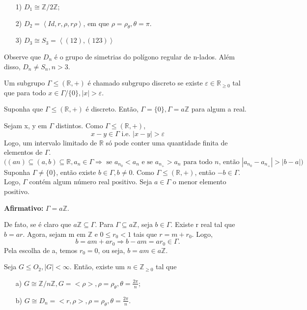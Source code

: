 \documentclass[Algebra/algebra_notes.tex]{subfiles}
\begin{document}
\begin{example*}
	\begin{itemize}
		\item[1)] \(D_{1}\cong{\mathbb{Z}/2 \mathbb{Z}}\);
		\item[2)] \(D_{2} = \left< Id, r, \rho , r\rho  \right>\), em que \(\rho = \rho _{\theta }, \theta =\pi \).
		\item[3)] \(D_{3}\cong{S_{3}} = \left< (12), (123) \right>\)
	\end{itemize}
\end{example*}
Observe que \(D_{n}\) é o grupo de simetrias do polígono regular de n-lados.
Além disso, \(D_{n}\neq S_{n}, n >3\).
\begin{def*}
	Um subgrupo \(\Gamma\leq (\mathbb{R}, +)\) é chamado subgrupo discreto se existe
	\(\varepsilon  \in \mathbb{R}_{\geq 0}\) tal que para todo \(x\in\Gamma/\{0\}, |x| > \varepsilon .\)
\end{def*}
\begin{lemma*}
	Suponha que \(\Gamma\leq (\mathbb{R}, +)\) é discreto. Então, \(\Gamma =\{0\}, \Gamma =a \mathbb{Z}\)
	para algum a real.
\end{lemma*}
\begin{proof*}
	Sejam x, y em \(\Gamma \) distintos. Como \(\Gamma\leq (\mathbb{R}, +)\),
	\[
		x - y\in \Gamma  \text{ i.e. }  |x-y| > \varepsilon
	\]
	Logo, um intervalo limitado de \(\mathbb{R}\) só pode conter uma quantidade finita
	de elementos de \(\Gamma \).
	\[
		\biggl((an)\subseteq{(a,b)\subseteq{\mathbb{R}}}, a_{n}\in \Gamma \Rightarrow \text{ se } a_{n_{0}} < a_{n}\text{ e se } a_{n_{+}} > a_{n}\text{ para todo } n \text{, então } |a_{n_{0}}-a_{n_{+}}| > |b-a| \biggr)
	\]
	Suponha \(\Gamma \neq\{0\}\), então existe \(b\in \Gamma , b\neq0\). Como
	\(\Gamma\leq (\mathbb{R}, +)\), então \(-b\in \Gamma \). Logo, \(\Gamma \) contém
	algum número real positivo. Seja \(a\in\Gamma \) o menor elemento positivo.

	\textbf{Afirmativo: } \(\Gamma =a \mathbb{Z}\).

	De fato, se é claro que \(a \mathbb{Z} \subseteq{\Gamma }\). Para \(\Gamma \subseteq{a \mathbb{Z}}\),
	seja \(b\in \Gamma.\) Existe r real tal que \(b=ar\). Agora, sejam m em \(\mathbb{Z}\)
	e \(0\leq r_{0} < 1\) tais que \(r = m + r_{0}\). Logo,
	\[
		b = am + ar_{0} \Rightarrow b-am = ar_{0}\in\Gamma.
	\]
	Pela escolha de a, temos \(r_{0} = 0\), ou seja, \(b=am\in a \mathbb{Z}\). \qedsymbol
\end{proof*}
\begin{theorem*}
	Seja \(G\leq O_{2}, |G| < \infty\). Então, existe um \(n\in \mathbb{Z}_{\geq 0}\) tal que
	\begin{itemize}
		\item[a)] \(G\cong{\mathbb{Z}/n \mathbb{Z}}, G = <\rho >, \rho = \rho _{\theta }, \theta =\frac{2\pi }{n}\);
		\item[b)] \(G\cong{D_{n} = <r, \rho >}, \rho  = \rho _{\theta }, \theta =\frac{2\pi }{n}\).
	\end{itemize}
\end{theorem*}
\end{document}
